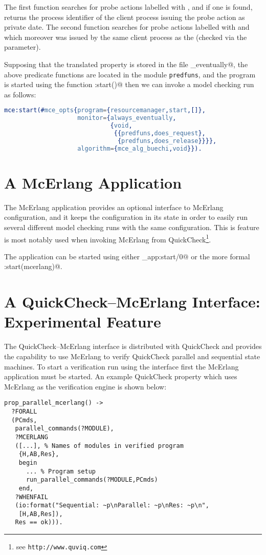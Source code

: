 \documentclass[a4paper]{article}
\begin{document}
The first function searches for probe actions labelled with
\lstinline@request@, and if one is found, returns the process identifier
of the client process issuing the probe action as private date.
The second function searches for probe actions labelled
with \lstinline@release@ and which moreover was issued
by the same client process as the \lstinline@request@
(checked via the \lstinline@ClientPid@ parameter).

Supposing that the translated property is stored in
the file \lstinline@always_eventually@, the above
predicate functions are located in the module \lstinline{predfuns},
and the program
is started using the function \lstinline@resourcemanager:start()@ 
then we can invoke a model checking run as follows:
\begin{lstlisting}[language=Erlang]
mce:start(#mce_opts{program={resourcemanager,start,[]},
                    monitor={always_eventually,
                             {void,
                              {{predfuns,does_request},
                               {predfuns,does_release}}}},
                    algorithm={mce_alg_buechi,void}}).
\end{lstlisting}

\section{A McErlang Application}

The McErlang application provides an optional interface to McErlang
configuration, and it keeps the configuration in its state in order to
easily run several different model checking runs with the same
configuration. This is feature is most notably used when invoking
McErlang from QuickCheck\footnote{see \texttt{http://www.quviq.com}}.

\begin{sloppypar}
The application can be started using either
\lstinline@mce_app:start/0@ or the more
formal \lstinline@application:start(mcerlang)@.
\end{sloppypar}


\section{A QuickCheck--McErlang Interface: Experimental Feature}

The QuickCheck--McErlang interface is distributed with QuickCheck
and provides the capability to use McErlang to verify
QuickCheck parallel and sequential state machines.
To start a verification run using the interface first the 
McErlang application must be started.
An example QuickCheck property which uses McErlang as the verification
engine is shown below:
\begin{lstlisting}
prop_parallel_mcerlang() ->
  ?FORALL
  (PCmds,
   parallel_commands(?MODULE),
   ?MCERLANG
   ([...], % Names of modules in verified program
    {H,AB,Res},
    begin
      ... % Program setup
      run_parallel_commands(?MODULE,PCmds)
    end,
   ?WHENFAIL
   (io:format("Sequential: ~p\nParallel: ~p\nRes: ~p\n",
    [H,AB,Res]),
   Res == ok))).
\end{lstlisting}
\end{document}
